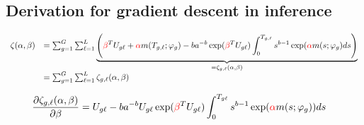 \documentclass[a4paper]{article}
\begin{document}
\begin{myAppendix}
    \findem
    
\newpage

\subsection{Derivation for gradient descent in inference}

$$\begin{array}{rl}
\zeta(\alpha, \beta) &= \sum_{g=1} ^{G} \sum_{\ell=1} ^{L} \underbrace{\left(\textcolor{red}{\beta} ^T U_{g\ell} + \textcolor{red}{\alpha} m(T_{g,\ell}; \varphi_g) - ba^{-b}\exp(\textcolor{red}{\beta}^T U_{g\ell})\int_0^{T_{g,\ell}} s^{b-1} \exp(\textcolor{red}{\alpha}m(s;\varphi_g)ds \right)}_{=\zeta_{g,\ell}(\alpha, \beta)}
\\  &=\sum_{g=1} ^{G} \sum_{\ell=1} ^{L} \zeta_{g,\ell}(\alpha, \beta)
\end{array}$$

\begin{align*}
    \frac{\partial \zeta_{g,\ell}(\alpha, \beta)}{\partial \beta} &=  U_{g\ell} - ba^{-b} U_{g\ell} \exp(\textcolor{red}{\beta}^T U_{g\ell}) \int_0^{T_{g\ell}} s^{b-1} \exp(\textcolor{red}{\alpha}m(s ; \varphi_g)) ds
\end{align*}


\end{myAppendix}
\end{document}
